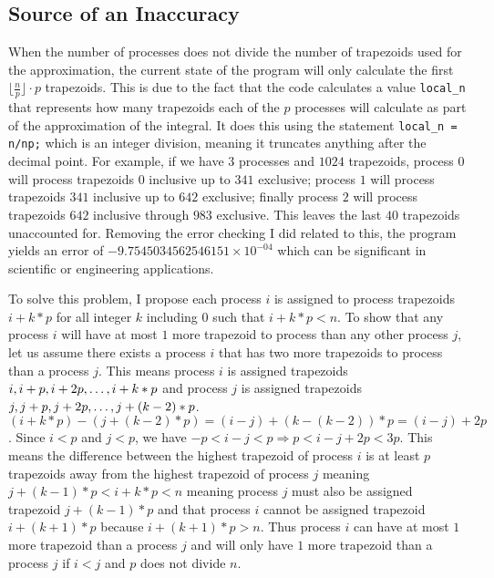 \documentclass[11pt]{article}
\begin{document}
\subsection{Source of an Inaccuracy}
When the number of processes does not divide the number of trapezoids used for the approximation, the current state of the program will only calculate the first $ \lfloor\frac{n}{p}\rfloor \cdot p $ trapezoids. This is due to the fact that the code calculates a value \texttt{local\_n} that represents how many trapezoids each of the $p$ processes will calculate as part of the approximation of the integral. It does this using the statement \texttt{local\_n = n/np;} which is an integer division, meaning it truncates anything after the decimal point. For example, if we have $3$ processes and $1024$ trapezoids, process $0$will process trapezoids $0$ inclusive up to $341$ exclusive; process $1$ will process trapezoids $341$ inclusive up to $642$ exclusive; finally process $2$ will process trapezoids $642$ inclusive through $983$ exclusive. This leaves the last $40$ trapezoids unaccounted for. Removing the error checking I did related to this, the program yields an error of $ -9.7545034562546151\times10^{-04}$ which can be significant in scientific or engineering applications.

To solve this problem, I propose each process $i$ is assigned to process trapezoids $i+k*p$ for all integer $k$ including $0$ such that $i+k*p < n$. To show that any process $i$ will have at most $1$ more trapezoid to process than any other process $j$, let us assume there exists a process $i$ that has two more trapezoids to process than a process $j$. This means process $i$ is assigned trapezoids $i, i+p, i+2p,\mathellipsis, i+k*p$ and process $j$ is assigned trapezoids $j, j+p, j+2p, \mathellipsis, j+(k-2)*p$. $ (i+k*p)-(j+(k-2)*p) = (i-j)+(k-(k-2))*p = (i-j)+2p $. Since $i<p$ and $j<p$, we have $-p < i-j < p \Longrightarrow p < i-j +2p < 3p $. This means the difference between the highest trapezoid of process $i$ is at least $p$ trapezoids away from the highest trapezoid of process $j$ meaning $j+(k-1)*p < i+k*p < n$ meaning process $j$ must also be assigned trapezoid $j+(k-1)*p$ and that process $i$ cannot be assigned trapezoid $i+(k+1)*p$ because $i+(k+1)*p > n$. Thus process $i$ can have at most $1$ more trapezoid than a process $j$ and will only have $1$ more trapezoid than a process $j$ if $i < j$ and $p$ does not divide $n$.
\end{document}
